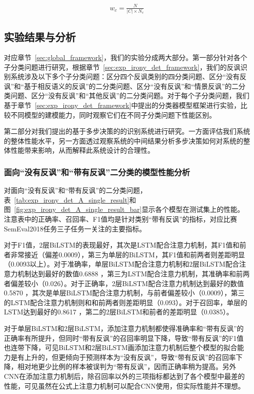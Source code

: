 \begin{align}
    \label{eq:class_weight}
    w_c = \frac{N}{|C| \times N_c}
\end{align}

\subsection{实验结果与分析}

对应章节~\ref{sec:global_framework}，我们的实验分成两大部分。第一部分针对各个子分类问题进行研究，根据章节~\ref{sec:exp_irony_det_framework}，我们的反讽识别系统涉及以下多个子分类问题：区分四个反讽类别的四分类问题、区分“没有反讽”和“基于相反语义的反讽”的二分类问题、区分“没有反讽”和“情景反讽”的二分类问题、区分“没有反讽”和“其他反讽”的二分类问题。对于每个子分类问题，我们基于章节~\ref{sec:exp_irony_det_framework}中提出的分类器模型框架进行实验，比较不同模型的建模能力，同时观察它们在不同子分类问题下性能区别。

第二部分对我们提出的基于多步决策的的识别系统进行研究。一方面评估我们系统的整体性能水平，另一方面透过观察系统的中间结果分析多步决策如何对系统的整体性能带来影响，从而解释此系统设计的合理性。

\subsubsection{面向“没有反讽”和“带有反讽”二分类的模型性能分析}
\label{sssec:exp_irony_det_A_base}

对面向“没有反讽”和“带有反讽”的二分类问题，表~\ref{tab:exp_irony_det_A_single_result}和图~\ref{fig:exp_irony_det_A_single_result_bar}显示各个模型在测试集上的性能。注意表中的正确率、召回率、F1值均是针对类别“带有反讽”的指标，对应比赛SemEval2018任务三子任务一关注的主要指标。

对于F1值，2层BiLSTM的表现最好，其次是LSTM配合注意力机制，其F1值和前者非常接近（偏差0.0009），第三为单层的BiLSTM，其F1值和前两者则差距明显（0.0093以上）。对于准确率，单层BiLSTM配合注意力机制和2层BiLSTM配合注意力机制达到最好的数值0.6888 ，第三为LSTM配合注意力机制，其准确率和前两者偏差较小（0.026）。对于正确率，2层BiLSTM配合注意力机制达到最好的数值0.5870 ，其次是单层BiLSTM配合注意力机制，与前者偏差较小（0.0009），第三的LSTM配合注意力机制则和和前两者则差距明显（0.093）。对于召回率，单层的LSTM达到最好的0.8617 ，第二的2层BiLSTM和前者的差距明显（0.0385）。

对于单层BiLSTM和2层BiLSTM，添加注意力机制都使得准确率和“带有反讽”的正确率有所提升，但同时“带有反讽”的召回率明显下降，导致“带有反讽”的F1值也连带下降，可见BiLSTM和2层BiLSTM画添加注意力机制后整个模型的拟合能力是有上升的，但更倾向于预测样本为“没有反讽”，导致“带有反讽”的召回率下降，相对地更少比例的样本被误判为“带有反讽”，因而正确率稍为提高。另外CNN在添加注意力机制后，除召回率以外的三项指标都达到了各个模型中最差的性能，可见虽然在公式上注意力机制可以配合CNN使用，但实际性能并不理想。

